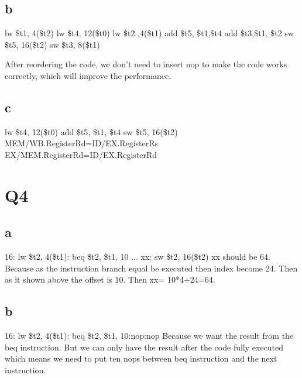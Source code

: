 \documentclass[]{article}
\begin{document}
\subsection*{b}
lw \$t1, 4(\$t2)\newline
lw \$t4, 12(\$t0)\newline
lw \$t2 ,4(\$t1)\newline
add \$t5, \$t1,\$t4\newline
add \$t3,\$t1, \$t2\newline
sw \$t5, 16(\$t2)\newline
sw \$t3, 8(\$t1)\newline

After reordering the code, we don't need to insert nop to make the code works correctly, which will improve the performance. \newline

\subsection*{c}
lw  \$t4, 12(\$t0) \newline
add \$t5, \$t1, \$t4 \newline
sw  \$t5, 16(\$t2) \newline
MEM/WB.RegisterRd=ID/EX.RegisterRs \newline
EX/MEM.RegisterRd=ID/EX.RegisterRd\newline




\section*{Q4}
\subsection*{a}
16: lw \$t2, 4(\$t1): beq \$t2, \$t1, 10\newline
...\newline
xx: sw \$t2, 16(\$t2)\newline
 xx should be 64. Because as the instruction branch equal be executed then index become 24. Then as it shown above the offset is 10. Then xx= 10*4+24=64. \newline
\subsection*{b}
16: lw \$t2, 4(\$t1): beq \$t2, \$t1, 10:nop:nop\newline
Because we want the result from the beq instruction. But we can only have the result after the code fully executed which means we need to put ten nops between beq instruction and the next instruction. \newline
\end{document}
